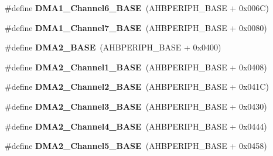 \begin{DoxyCompactItemize}
\item 
\hypertarget{group___peripheral__memory__map_ga896c2c7585dd8bc3969cf8561f689d2d}{\#define {\bfseries D\-M\-A1\-\_\-\-Channel6\-\_\-\-B\-A\-S\-E}~(A\-H\-B\-P\-E\-R\-I\-P\-H\-\_\-\-B\-A\-S\-E + 0x006\-C)}\label{group___peripheral__memory__map_ga896c2c7585dd8bc3969cf8561f689d2d}

\item 
\hypertarget{group___peripheral__memory__map_gaeee0d1f77d0db1db533016a09351166c}{\#define {\bfseries D\-M\-A1\-\_\-\-Channel7\-\_\-\-B\-A\-S\-E}~(A\-H\-B\-P\-E\-R\-I\-P\-H\-\_\-\-B\-A\-S\-E + 0x0080)}\label{group___peripheral__memory__map_gaeee0d1f77d0db1db533016a09351166c}

\item 
\hypertarget{group___peripheral__memory__map_gab72a9ae145053ee13d1d491fb5c1df64}{\#define {\bfseries D\-M\-A2\-\_\-\-B\-A\-S\-E}~(A\-H\-B\-P\-E\-R\-I\-P\-H\-\_\-\-B\-A\-S\-E + 0x0400)}\label{group___peripheral__memory__map_gab72a9ae145053ee13d1d491fb5c1df64}

\item 
\hypertarget{group___peripheral__memory__map_gad3bd6c4201d12f5d474518c1b02f8e3b}{\#define {\bfseries D\-M\-A2\-\_\-\-Channel1\-\_\-\-B\-A\-S\-E}~(A\-H\-B\-P\-E\-R\-I\-P\-H\-\_\-\-B\-A\-S\-E + 0x0408)}\label{group___peripheral__memory__map_gad3bd6c4201d12f5d474518c1b02f8e3b}

\item 
\hypertarget{group___peripheral__memory__map_ga22f39f23c879c699b88e04a629f69d1c}{\#define {\bfseries D\-M\-A2\-\_\-\-Channel2\-\_\-\-B\-A\-S\-E}~(A\-H\-B\-P\-E\-R\-I\-P\-H\-\_\-\-B\-A\-S\-E + 0x041\-C)}\label{group___peripheral__memory__map_ga22f39f23c879c699b88e04a629f69d1c}

\item 
\hypertarget{group___peripheral__memory__map_ga6f2369b8bc155fb55a28891987605c2c}{\#define {\bfseries D\-M\-A2\-\_\-\-Channel3\-\_\-\-B\-A\-S\-E}~(A\-H\-B\-P\-E\-R\-I\-P\-H\-\_\-\-B\-A\-S\-E + 0x0430)}\label{group___peripheral__memory__map_ga6f2369b8bc155fb55a28891987605c2c}

\item 
\hypertarget{group___peripheral__memory__map_ga01b063266473f290a55047654fbbfbee}{\#define {\bfseries D\-M\-A2\-\_\-\-Channel4\-\_\-\-B\-A\-S\-E}~(A\-H\-B\-P\-E\-R\-I\-P\-H\-\_\-\-B\-A\-S\-E + 0x0444)}\label{group___peripheral__memory__map_ga01b063266473f290a55047654fbbfbee}

\item 
\hypertarget{group___peripheral__memory__map_ga1eea983a5d68bf36f4d19fbb07955ca1}{\#define {\bfseries D\-M\-A2\-\_\-\-Channel5\-\_\-\-B\-A\-S\-E}~(A\-H\-B\-P\-E\-R\-I\-P\-H\-\_\-\-B\-A\-S\-E + 0x0458)}\label{group___peripheral__memory__map_ga1eea983a5d68bf36f4d19fbb07955ca1}


\end{DoxyCompactItemize}
